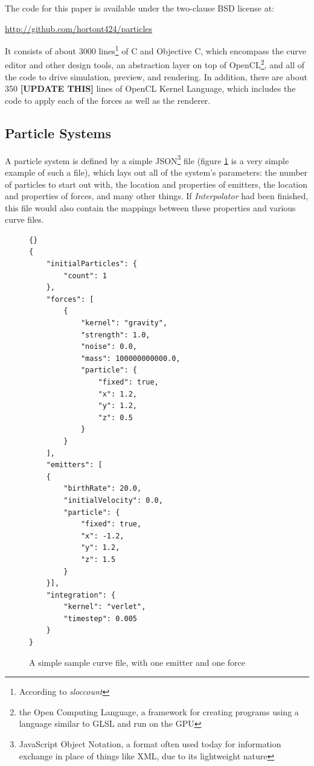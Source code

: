 \documentclass{acmsiggraph}
\begin{document}
The code for this paper is available under the two-clause BSD license at:

\url{http://github.com/hortont424/particles}

It consists of about 3000 lines\footnote{According to {\it sloccount}} of C and Objective C, which encompass the curve editor and other design tools, an abstraction layer on top of OpenCL\footnote{the Open Computing Language, a framework for creating programs using a language similar to GLSL and run on the GPU}, and all of the code to drive simulation, preview, and rendering. In addition, there are about 350 {\bf [UPDATE THIS]} lines of OpenCL Kernel Language, which includes the code to apply each of the forces as well as the renderer.

\subsection{Particle Systems}

A particle system is defined by a simple JSON\footnote{JavaScript Object Notation, a format often used today for information exchange in place of things like XML, due to its lightweight nature} file (figure \ref{curveListing} is a very simple example of such a file), which lays out all of the system's parameters: the number of particles to start out with, the location and properties of emitters, the location and properties of forces, and many other things. If {\it Interpolator} had been finished, this file would also contain the mappings between these properties and various curve files.

\begin{figure}

    \lstset{language=Python}
    \lstset{basicstyle=\footnotesize\ttfamily}
    \lstset{numbers=left, numberstyle=\tiny, stepnumber=1, numbersep=5pt}
    \begin{lstlisting}[frame=trbl]{}
{
    "initialParticles": {
        "count": 1
    },
    "forces": [
        {
            "kernel": "gravity",
            "strength": 1.0,
            "noise": 0.0,
            "mass": 100000000000.0,
            "particle": {
                "fixed": true,
                "x": 1.2,
                "y": 1.2,
                "z": 0.5
            }
        }
    ],
    "emitters": [
    {
        "birthRate": 20.0,
        "initialVelocity": 0.0,
        "particle": {
            "fixed": true,
            "x": -1.2,
            "y": 1.2,
            "z": 1.5
        }
    }],
    "integration": {
        "kernel": "verlet",
        "timestep": 0.005
    }
}
    \end{lstlisting}

    \caption{A simple sample curve file, with one emitter and one force}
    \label{curveListing}
\end{figure}
\end{document}
